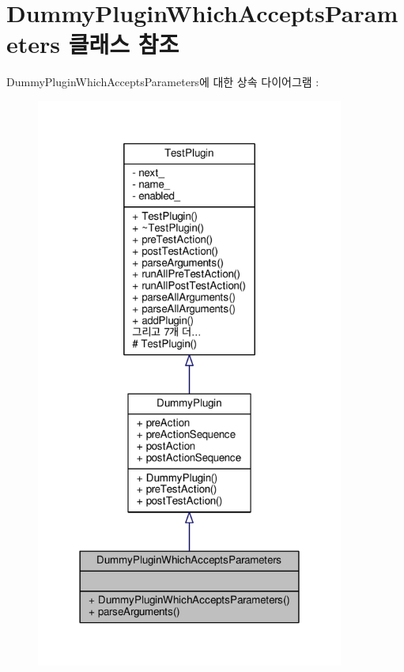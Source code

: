 \hypertarget{class_dummy_plugin_which_accepts_parameters}{}\section{Dummy\+Plugin\+Which\+Accepts\+Parameters 클래스 참조}
\label{class_dummy_plugin_which_accepts_parameters}


Dummy\+Plugin\+Which\+Accepts\+Parameters에 대한 상속 다이어그램 \+: 
\nopagebreak
\begin{figure}[H]
\begin{center}
\leavevmode
\includegraphics[width=287pt]{class_dummy_plugin_which_accepts_parameters__inherit__graph}
\end{center}
\end{figure}


